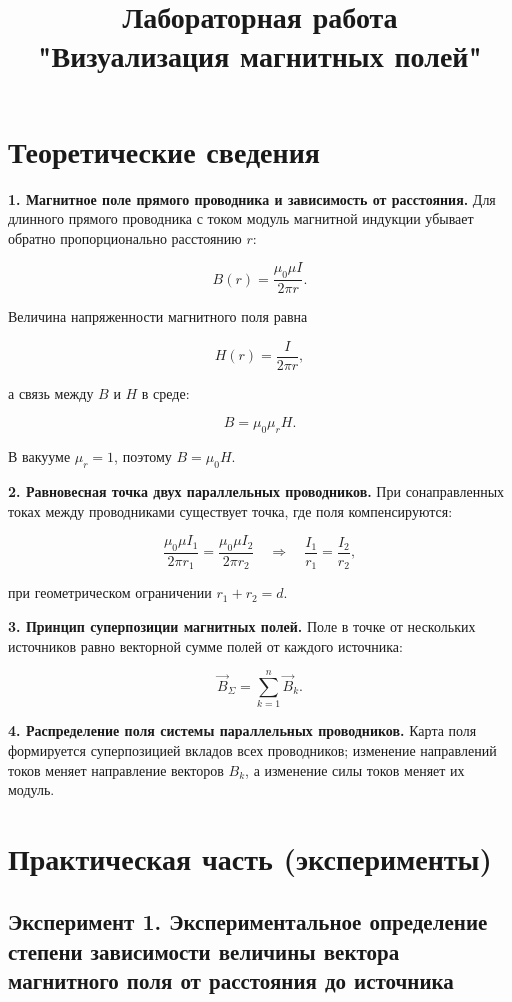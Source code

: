 \documentclass[12pt,a4paper]{article}
\title{Лабораторная работа\\"Визуализация магнитных полей"}
\author{}
\date{}
\begin{document}
\maketitle

\section*{Теоретические сведения}

\textbf{1. Магнитное поле прямого проводника и зависимость от расстояния.}
Для длинного прямого проводника с током модуль магнитной индукции убывает обратно пропорционально расстоянию $r$:

\[
B(r) = \frac{\mu_0 \mu I}{2\pi r}.
\]

Величина напряженности магнитного поля равна

\[
H(r) = \frac{I}{2\pi r},
\]

а связь между $B$ и $H$ в среде:

\[
B = \mu_0 \mu_r H.
\]

В вакууме $\mu_r = 1$, поэтому $B = \mu_0 H$.

\textbf{2. Равновесная точка двух параллельных проводников.}
При сонаправленных токах между проводниками существует точка, где поля компенсируются:

\[
\frac{\mu_0 \mu I_1}{2\pi r_1} = \frac{\mu_0 \mu I_2}{2\pi r_2}
\quad \Rightarrow \quad
\frac{I_1}{r_1} = \frac{I_2}{r_2},
\]

при геометрическом ограничении $r_1 + r_2 = d$.

\textbf{3. Принцип суперпозиции магнитных полей.}
Поле в точке от нескольких источников равно векторной сумме полей от каждого источника:

\[
\vec{B}_{\Sigma} = \sum\limits_{k=1}^{n} \vec{B}_k.
\]

\textbf{4. Распределение поля системы параллельных проводников.}
Карта поля формируется суперпозицией вкладов всех проводников; изменение направлений токов меняет направление векторов $B_k$, а изменение силы токов меняет их модуль.

\clearpage

\section*{Практическая часть (эксперименты)}

\subsection*{Эксперимент 1. Экспериментальное определение степени зависимости величины вектора магнитного поля от расстояния до источника}
\end{document}

